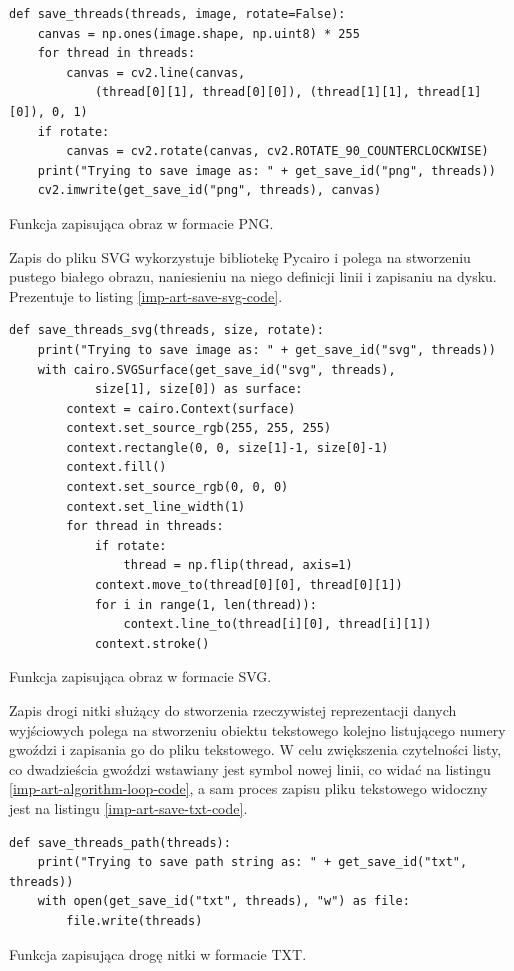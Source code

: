         \begin{code}[H]
        \begin{verbatim}
def save_threads(threads, image, rotate=False):
    canvas = np.ones(image.shape, np.uint8) * 255
    for thread in threads:
        canvas = cv2.line(canvas, 
            (thread[0][1], thread[0][0]), (thread[1][1], thread[1][0]), 0, 1)
    if rotate:
        canvas = cv2.rotate(canvas, cv2.ROTATE_90_COUNTERCLOCKWISE)
    print("Trying to save image as: " + get_save_id("png", threads))
    cv2.imwrite(get_save_id("png", threads), canvas)
        \end{verbatim}
        \caption{Funkcja zapisująca obraz w formacie PNG.}
        \label{imp-art-save-png-code}
        \end{code}

        Zapis do pliku SVG wykorzystuje bibliotekę Pycairo i polega na stworzeniu pustego białego obrazu, naniesieniu na niego definicji linii i zapisaniu na dysku. Prezentuje to listing \ref{imp-art-save-svg-code}.
        \begin{code}[H]
        \begin{verbatim}
def save_threads_svg(threads, size, rotate):
    print("Trying to save image as: " + get_save_id("svg", threads))
    with cairo.SVGSurface(get_save_id("svg", threads), 
            size[1], size[0]) as surface:
        context = cairo.Context(surface)
        context.set_source_rgb(255, 255, 255)
        context.rectangle(0, 0, size[1]-1, size[0]-1)
        context.fill()
        context.set_source_rgb(0, 0, 0)
        context.set_line_width(1)
        for thread in threads:
            if rotate:
                thread = np.flip(thread, axis=1)
            context.move_to(thread[0][0], thread[0][1])
            for i in range(1, len(thread)):
                context.line_to(thread[i][0], thread[i][1])
            context.stroke()
        \end{verbatim}
        \caption{Funkcja zapisująca obraz w formacie SVG.}
        \label{imp-art-save-svg-code}
        \end{code}

        Zapis drogi nitki służący do stworzenia rzeczywistej reprezentacji danych wyjściowych polega na stworzeniu obiektu tekstowego kolejno listującego numery gwoździ i zapisania go do pliku tekstowego. W celu zwiększenia czytelności listy, co dwadzieścia gwoździ wstawiany jest symbol nowej linii, co widać na listingu \ref{imp-art-algorithm-loop-code}, a sam proces zapisu pliku tekstowego widoczny jest na listingu \ref{imp-art-save-txt-code}.
        \begin{code}[H]
        \begin{verbatim}
def save_threads_path(threads):
    print("Trying to save path string as: " + get_save_id("txt", threads))
    with open(get_save_id("txt", threads), "w") as file:
        file.write(threads)
        \end{verbatim}
        \caption{Funkcja zapisująca drogę nitki w formacie TXT.}
        \label{imp-art-save-txt-code}
        \end{code}

